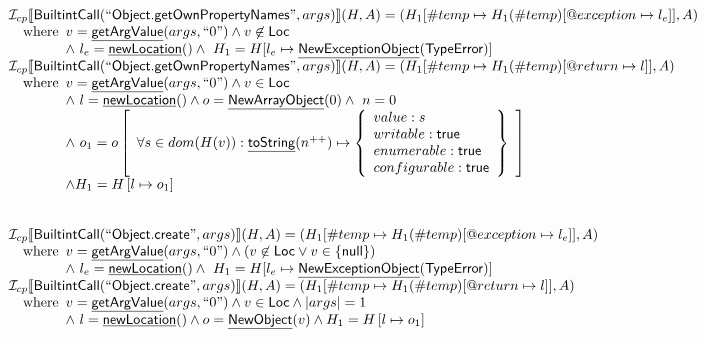 \documentclass{article}
\makeatletter
\newcommand{\SF}[1]{\mbox{\textsf{#1}}}
\newcommand{\wherec}[1]{{\rm where}\begin{array}[t]{l}#1\end{array}}
\newcommand{\Loc}{\SF{Loc}}
\newcommand{\I}{\mathcal{I}}
\newcommand{\lbr}{\llbracket}
\newcommand{\rbr}{\rrbracket}
\newcommand{\hf}[1]{\underline{\sf #1}}
\newcommand{\varloc}[1]{\##1}
\newcommand{\varprop}[1]{@#1}
\makeatother
\begin{document}
\[\begin{array}{l}
\I _{cp}\lbr \SF{BuiltintCall}(``\SF{Object.getOwnPropertyNames}",args)\rbr(H,A)
 = (H_1[\varloc{temp}\mapsto H_1(\varloc{temp})[\varprop{exception}\mapsto l_{e}]], A) \\
\quad\wherec{
  v = \hf{getArgValue}(args, ``0") \land v\not\in\Loc\\
  \land\ l_e = \hf{newLocation}() \land\ H_1=H[l_e\mapsto\hf{NewExceptionObject}(\SF{TypeError})] }\\

\I _{cp}\lbr \SF{BuiltintCall}(``\SF{Object.getOwnPropertyNames}",args)\rbr(H,A)
 = (H_1[\#temp \mapsto H_1(\#temp)[@return \mapsto l]], A)\\
  \quad\wherec{
  v = \hf{getArgValue}(args, ``0") \land v \in\Loc\\
  \land\ l=\hf{newLocation}() \land o=\hf{NewArrayObject}(0) \land\ n = 0\\
  \land\ o_1 = o\left[
    \begin{array}{l}
      \forall s \in dom(H(v)): 
      \hf{toString}(n^{++}) \mapsto \left\{
        \begin{array}{l}
          value: s\\
          writable: \SF{true} \\
          enumerable: \SF{true}\\
          configurable: \SF{true} \\
        \end{array}
        \right\}\\
    \end{array}\right]\\
  \land H_1=H\left[l\mapsto o_1\right]}\\
\\\\



\I _{cp}\lbr \SF{BuiltintCall}(``\SF{Object.create}",args)\rbr(H,A)
 = (H_1[\varloc{temp}\mapsto H_1(\varloc{temp})[\varprop{exception}\mapsto l_{e}]], A) \\
\quad\wherec{
  v = \hf{getArgValue}(args, ``0") \land (v\not\in\Loc \lor v \in \{\SF{null}\})\\
  \land\ l_e = \hf{newLocation}() \land\ H_1=H[l_e\mapsto\hf{NewExceptionObject}(\SF{TypeError})] }\\

\I _{cp}\lbr \SF{BuiltintCall}(``\SF{Object.create}",args)\rbr(H,A)
 = (H_1[\#temp \mapsto H_1(\#temp)[@return \mapsto l]], A)\\
\quad\wherec{
  v = \hf{getArgValue}(args, ``0") \land v \in\Loc \land |args| = 1 \\
  \land\ l=\hf{newLocation}() \land o=\hf{NewObject}(v)
  \land H_1 = H\left[l\mapsto o_1\right]}\\


\end{array}\]
\end{document}
